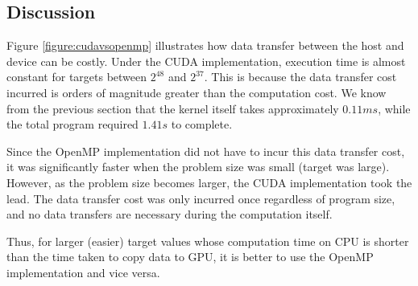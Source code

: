 \documentclass[a4paper,12pt]{article}
\begin{document}
\subsection{Discussion}

Figure \ref{figure:cudavsopenmp} illustrates how data transfer between the host and device can be costly. Under the CUDA implementation, execution time is almost constant for targets between $2^{48}$ and $2^{37}$. This is because the data transfer cost incurred is orders of magnitude greater than the computation cost. We know from the previous section that the kernel itself takes approximately $0.11 ms$, while the total program required $1.41 s$ to complete.

Since the OpenMP implementation did not have to incur this data transfer cost, it was significantly faster when the problem size was small (target was large). However, as the problem size becomes larger, the CUDA implementation took the lead. The data transfer cost was only incurred once regardless of program size, and no data transfers are necessary during the computation itself.

Thus, for larger (easier) target values whose computation time on CPU is shorter than the time taken to copy data to GPU, it is better to use the OpenMP implementation and vice versa.

\newpage
\end{document}
